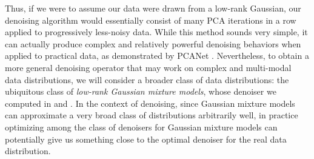 \documentclass[../../book-main.tex]{subfiles}
\begin{document}
Thus, if we were to assume our data were drawn from a low-rank
Gaussian, our denoising algorithm would essentially consist of many
PCA iterations in a row applied to progressively less-noisy data.
While this method sounds very simple, it can actually produce complex
and relatively powerful denoising behaviors when applied to practical
data, as demonstrated by PCANet \parencite{chan2015pcanet}.
Nevertheless, to obtain a more general denoising operator
that may work on complex and multi-modal data distributions, we will
consider a broader class of data distributions: the ubiquitous
class of \textit{low-rank Gaussian mixture models}, whose denoiser
we computed in  and
. In the context of
denoising, since Gaussian mixture models can approximate a very broad
class of distributions arbitrarily well, in practice optimizing among
the class of denoisers for Gaussian mixture models can potentially
give us something close to the optimal denoiser for the real data distribution.
\end{document}

